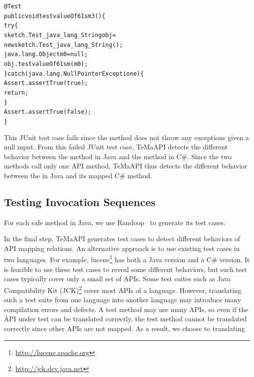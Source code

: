 \begin{CodeOut}%
\begin{alltt}
 @Test
 public void testvalueOf61sm3()\{
   try\{
     sketch.Test_java_lang_String obj =
           new sketch.Test_java_lang_String();
     java.lang.Object m0 = null;
     obj.testvalueOf61sm(m0);
   \}catch(java.lang.NullPointerException e)\{
     Assert.assertTrue(true);
     return;
   \}
   Assert.assertTrue(false);
 \}
\end{alltt}
\end{CodeOut}

This JUnit test case fails since the  method does not throw any exceptions given a null input.
From this failed JUnit test case, TeMaAPI detects the different behavior between the  method in Java and the  method in C\#. Since the two methods call only one API method, TeMaAPI thus detects the different behavior between the  in Java and its mapped C\# method.

\subsection{Testing Invocation Sequences}
\label{sec:approach:sequence}

For each safe method in Java, we use Randoop~\cite{pacheco2007feedback} to generate its test cases.

In the final step, TeMaAPI generates test cases to detect different behaviors of API mapping relations. An alternative approach is to use existing test cases in two languages. For example, lucene\footnote{\url{http://lucene.apache.org}} has both a Java version and a C\# version. It is feasible to use these test cases to reveal some different behaviors, but such test cases typically cover only a small set of APIs. Some test suites such as Java Compatibility Kit (JCK)\footnote{\url{http://jck.dev.java.net}} cover most APIs of a language. However, translating such a test suite from one language into another language may introduce many compilation errors and defects. A test method may use many APIs, so even if the API under test can be translated correctly, the test method cannot be translated correctly since other APIs are not mapped. As a result, we choose to translating


